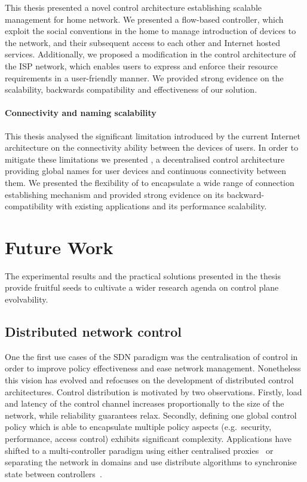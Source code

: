 This thesis presented a novel control architecture establishing scalable
management for home network. We presented a flow-based controller, which exploit
the social conventions in the home to manage introduction of devices  to the
network, and their subsequent access to each other and Internet hosted services.
Additionally, we proposed a modification in the control architecture of the ISP
network, which enables users to express and enforce their resource requirements
in a user-friendly manner. We provided strong evidence on the scalability,
backwards compatibility and effectiveness of our solution.  

\paragraph{Connectivity and naming scalability}

This thesis analysed the significant limitation introduced by the current
Internet architecture on the connectivity ability between the devices of users.
In order to mitigate these limitations we presented \signpost, a decentralised
control architecture providing global names for user devices and continuous
connectivity between them. We presented the flexibility of \signpost to
encapsulate a wide range of connection establishing mechanism and provided
strong evidence on its backward-compatibility with existing applications and its
performance scalability. 

\section{Future Work}
  
The experimental results and the practical solutions presented in the thesis
provide fruitful seeds to cultivate a wider research agenda on control plane
evolvability.

\subsection{Distributed network control}

One the first use cases of the SDN paradigm was the centralisation of control in
order to improve policy effectiveness and ease network management.  Nonetheless this
vision has evolved and refocuses on the development of distributed control
architectures. Control distribution is motivated by two observations.  Firstly,
load and latency of the control channel increases proportionally to the size of the
network, while reliability guarantees relax. Secondly,
defining one global control policy which is able to encapsulate multiple policy
aspects (e.g.~security, performance, access control) exhibits significant
complexity. Applications have shifted to a multi-controller paradigm using
either centralised proxies~\cite{flowvisor-osdi} or separating the network
in domains and use distribute algorithms to synchronise state between
controllers~\cite{Koponen10}. 

